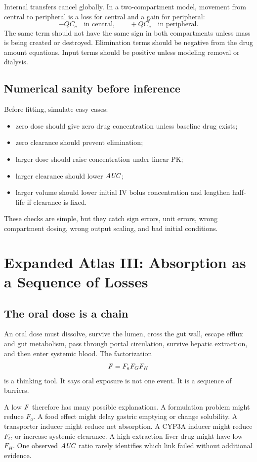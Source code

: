 Internal transfers cancel globally. In a two-compartment model, movement from central to peripheral is a loss for central and a gain for peripheral:
\[
  -Q C_c
  \quad \text{in central},
  \qquad
  +Q C_c
  \quad \text{in peripheral}.
\]
The same term should not have the same sign in both compartments unless mass is being created or destroyed. Elimination terms should be negative from the drug amount equations. Input terms should be positive unless modeling removal or dialysis.

\subsection{Numerical sanity before inference}

Before fitting, simulate easy cases:
\begin{itemize}[leftmargin=2em]
  \item zero dose should give zero drug concentration unless baseline drug exists;
  \item zero clearance should prevent elimination;
  \item larger dose should raise concentration under linear PK;
  \item larger clearance should lower \(\pkAUC\);
  \item larger volume should lower initial IV bolus concentration and lengthen half-life if clearance is fixed.
\end{itemize}
These checks are simple, but they catch sign errors, unit errors, wrong compartment dosing, wrong output scaling, and bad initial conditions.

\section{Expanded Atlas III: Absorption as a Sequence of Losses}

\subsection{The oral dose is a chain}

An oral dose must dissolve, survive the lumen, cross the gut wall, escape efflux and gut metabolism, pass through portal circulation, survive hepatic extraction, and then enter systemic blood. The factorization
\[
  \pkF=F_aF_GF_H
\]
is a thinking tool. It says oral exposure is not one event. It is a sequence of barriers.

A low \(\pkF\) therefore has many possible explanations. A formulation problem might reduce \(F_a\). A food effect might delay gastric emptying or change solubility. A transporter inducer might reduce net absorption. A CYP3A inducer might reduce \(F_G\) or increase systemic clearance. A high-extraction liver drug might have low \(F_H\). One observed \(\pkAUC\) ratio rarely identifies which link failed without additional evidence.

